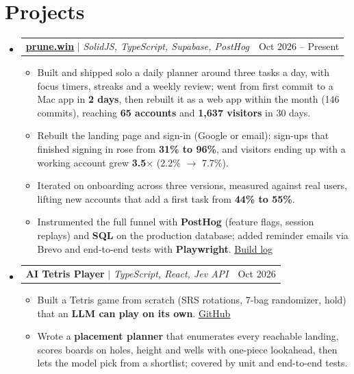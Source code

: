 \documentclass[letterpaper,11pt]{article}
\makeatletter
\newcommand{\resumeItem}[1]{\item\small{#1\vspace{-2pt}}}
\newcommand{\resumeProjectHeading}[2]{
  \item
  \begin{tabular*}{0.97\textwidth}{l@{\extracolsep{\fill}}r}
    \small#1 & #2 \\
  \end{tabular*}\vspace{-7pt}
}
\newcommand{\resumeSubHeadingListStart}{\begin{itemize}[leftmargin=0.15in,label={}]}
\newcommand{\resumeSubHeadingListEnd}{\end{itemize}}
\newcommand{\resumeItemListStart}{\begin{itemize}}
\newcommand{\resumeItemListEnd}{\end{itemize}\vspace{-5pt}}
\makeatother
\begin{document}
\section{Projects}
\resumeSubHeadingListStart
  \resumeProjectHeading
    {\textbf{\href{https://prune.win}{\underline{prune.win}}} $|$ \emph{SolidJS, TypeScript, Supabase, PostHog}}{Oct 2026 -- Present}
  \resumeItemListStart
    \resumeItem{Built and shipped solo a daily planner around three tasks a day, with focus timers, streaks and a weekly review; went from first commit to a Mac app in \textbf{2 days}, then rebuilt it as a web app within the month (146 commits), reaching \textbf{65 accounts} and \textbf{1,637 visitors} in 30 days.}
    \resumeItem{Rebuilt the landing page and sign-in (Google or email): sign-ups that finished signing in rose from \textbf{31\% to 96\%}, and visitors ending up with a working account grew \textbf{3.5$\times$} (2.2\% $\to$ 7.7\%).}
    \resumeItem{Iterated on onboarding across three versions, measured against real users, lifting new accounts that add a first task from \textbf{44\% to 55\%}.}
    \resumeItem{Instrumented the full funnel with \textbf{PostHog} (feature flags, session replays) and \textbf{SQL} on the production database; added reminder emails via Brevo and end-to-end tests with \textbf{Playwright}. \href{https://fornelli.dev/prune/}{\underline{Build log}}}
  \resumeItemListEnd
  \resumeProjectHeading
    {\textbf{AI Tetris Player} $|$ \emph{TypeScript, React, Jev API}}{Oct 2026}
  \resumeItemListStart
    \resumeItem{Built a Tetris game from scratch (SRS rotations, 7-bag randomizer, hold) that an \textbf{LLM can play on its own}. \href{https://github.com/ddavidefornelli/jev-tetris}{\underline{GitHub}}}
    \resumeItem{Wrote a \textbf{placement planner} that enumerates every reachable landing, scores boards on holes, height and wells with one-piece lookahead, then lets the model pick from a shortlist; covered by unit and end-to-end tests.}
  \resumeItemListEnd
\resumeSubHeadingListEnd
\end{document}
